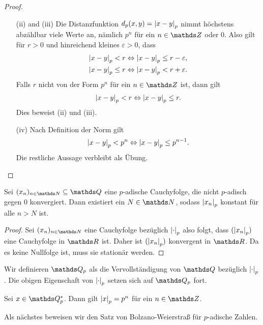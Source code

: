 \begin{satz}
\begin{proof}
\begin{enumerate}
\item[(ii) and (iii)] Die Distanzfunktion $d_p(x,y)=\left\vert x-y\right\vert_p$ nimmt höchstens abzählbar viele Werte an, nämlich $p^n$ für ein $n\in \Z$ oder $0$.
Also gilt für $r>0$ und hinreichend kleines $\varepsilon>0$, dass
\begin{align*}
\left\vert x-y\right\vert_p<r \Leftrightarrow \left\vert x-y\right\vert_p \leq r-\varepsilon,\\
\left\vert x-y\right\vert_p \leq r \Leftrightarrow \left\vert x-y\right\vert_p<r+\varepsilon.
\end{align*}
Falls $r$ nicht von der Form $p^n$ für ein $n\in \Z$ ist, dann gilt
\begin{align*}
\left\vert x-y\right\vert_p<r \Leftrightarrow \left\vert x-y\right\vert_p\leq r.
\end{align*}
Dies beweist (ii) und (iii).
\item[(iv)] Nach Definition der Norm gilt
\begin{align*}
\left\vert x-y\right\vert_p<p^n \Leftrightarrow \left\vert x-y\right\vert_p\leq p^{n-1}.
\end{align*}
Die restliche Aussage verbleibt als Übung.
\qedhere
\end{enumerate}
\end{proof}
\end{satz}

\begin{satz}
Sei $(x_n)_{n \in \N} \subseteq \Q$ eine $p$-adische Cauchyfolge, die nicht $p$-adisch gegen $0$ konvergiert.
Dann existiert ein $N \in \N$, sodass $\left\vert x_n\right\vert_p$ konstant für alle $n>N$ ist.
\begin{proof}
Sei $(x_n)_{n\in \N}$ eine Cauchyfolge bezüglich $\left\vert\cdot\right\vert_p$ also folgt, dass $(\left\vert x_n\right\vert_p)$ eine Cauchyfolge in $\R$ ist.
Daher ist $(\left\vert x_n\right\vert_p)$ konvergent in $\R$. Da es keine Nullfolge ist, muss sie stationär werden.
\end{proof}
\end{satz}

\begin{defi}
Wir definieren $\Q_p$ als die Vervollständigung von $\Q$ bezüglich $\left\vert\cdot\right\vert_p$.
Die obigen Eigenschaft von $\left\vert\cdot\right\vert_p$ setzen sich auf $\Q_p$ fort.
\end{defi}

\begin{bsp}
Sei $x\in \Q_p^\ast$. Dann gilt $\left\vert x\right\vert_p=p^n$ für ein $n\in \Z$.
\end{bsp}
Als nächstes beweisen wir den Satz von Bolzano-Weierstraß für $p$-adische Zahlen.

